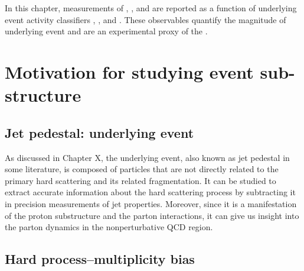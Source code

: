 \def \imgpath {"./figures/rt"}

In this chapter, measurements of \KOs, \LA, and \AL are reported as a function of underlying event activity classifiers \RT, \RTmin, and \RTmax. These observables quantify the magnitude of underlying event and are an experimental proxy of the \nmpi.

\section{Motivation for studying event sub-structure}

\subsection{Jet pedestal: underlying event}

As discussed in Chapter X, the underlying event, also known as jet pedestal in some literature, is composed of particles that are not directly related to the primary hard scattering and its related fragmentation. It can be studied to extract accurate information about the hard scattering process by subtracting it in precision measurements of jet properties. Moreover, since it is a manifestation of the proton substructure and the parton interactions, it can give us insight into the parton dynamics in the nonperturbative QCD region.


\subsection{Hard process--multiplicity bias}

